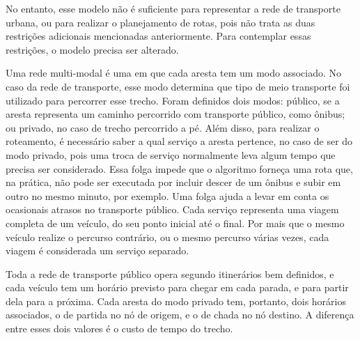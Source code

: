 No entanto, esse modelo não é suficiente para representar a rede de transporte urbana, ou para realizar o planejamento de rotas, pois não trata as duas restrições adicionais mencionadas anteriormente.
Para contemplar essas restrições, o modelo precisa ser alterado.

Uma rede multi-modal é uma em que cada aresta tem um modo associado. 
No caso da rede de transporte, esse modo determina que tipo de meio transporte foi utilizado para percorrer esse trecho.
Foram definidos dois modos: público, se a aresta representa um caminho percorrido com transporte público, como ônibus; ou privado, no caso de trecho percorrido a pé.
Além disso, para realizar o roteamento, é necessário saber a qual serviço a aresta pertence, no caso de ser do modo privado, pois uma troca de serviço normalmente leva algum tempo que precisa ser considerado. Essa folga impede que o algoritmo forneça uma rota que, na prática, não pode ser executada por incluir descer de um ônibus e subir em outro no mesmo minuto, por exemplo. Uma folga ajuda a levar em conta os ocasionais atrasos no transporte público.
Cada serviço representa uma viagem completa de um veículo, do seu ponto inicial até o final. Por mais que o mesmo veículo realize o percurso contrário, ou o mesmo percurso várias vezes, cada viagem é considerada um serviço separado.

Toda a rede de transporte público opera segundo itinerários bem definidos, e cada veículo tem um horário previsto para chegar em cada parada, e para partir dela para a próxima.
Cada aresta do modo privado tem, portanto, dois horários associados, o de partida no nó de origem, e o de chada no nó destino.
A diferença entre esses dois valores é o custo de tempo do trecho.

